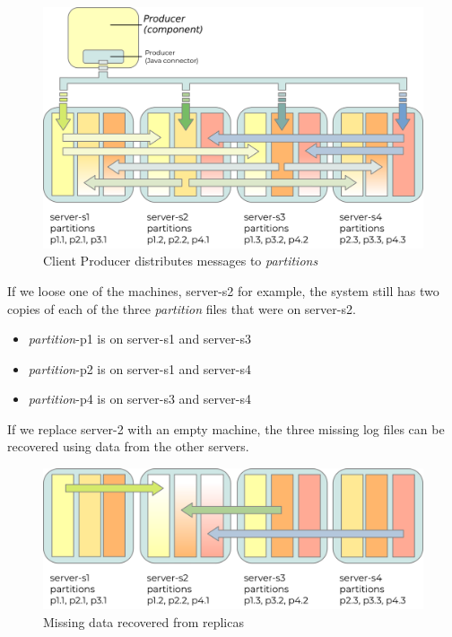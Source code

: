 \documentclass{article}
\newcommand{\kfpartition} {\textit{partition}\xspace}
\newcommand{\kfpartitions} {\textit{partitions}\xspace}
\newcommand{\javaname}[1] {{\ttfamily\color{codeblue} #1}}
\begin{document}
\begin{figure}[H]
\begin{center}
\includegraphics{images/kafka-partitions-03.png}
%
\caption{Client \javaname{Producer} distributes messages to \kfpartitions}
\label{fig:kafka-partitions-03}
\end{center}
\end{figure}

\clearpage
If we loose one of the machines, server-s2 for example, the system still has two copies of each of the three \kfpartition files that were on server-s2.

\begin{itemize}
    \item \kfpartition-p1 is on server-s1 and server-s3
    \item \kfpartition-p2 is on server-s1 and server-s4
    \item \kfpartition-p4 is on server-s3 and server-s4
\end{itemize}

If we replace server-2 with an empty machine, the three missing log files can be recovered using data from the other servers.

\begin{figure}[H]
\begin{center}
\includegraphics{images/kafka-partitions-04.png}
%
\caption{Missing data recovered from replicas}
\label{fig:kafka-partitions-04}
\end{center}
\end{figure}
\end{document}
